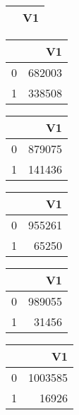 \bigskip\bigskip
\centering
\begin{tabular}{rr}
  \hline
 & V1 \\ 
  \hline
\hline
\end{tabular}

\bigskip\bigskip
\centering
\begin{tabular}{rr}
  \hline
 & V1 \\ 
  \hline
0 & 682003 \\ 
  1 & 338508 \\ 
   \hline
\end{tabular}

\bigskip\bigskip
\centering
\begin{tabular}{rr}
  \hline
 & V1 \\ 
  \hline
0 & 879075 \\ 
  1 & 141436 \\ 
   \hline
\end{tabular}

\bigskip\bigskip
\centering
\begin{tabular}{rr}
  \hline
 & V1 \\ 
  \hline
0 & 955261 \\ 
  1 & 65250 \\ 
   \hline
\end{tabular}

\bigskip\bigskip
\centering
\begin{tabular}{rr}
  \hline
 & V1 \\ 
  \hline
0 & 989055 \\ 
  1 & 31456 \\ 
   \hline
\end{tabular}

\bigskip\bigskip
\centering
\begin{tabular}{rr}
  \hline
 & V1 \\ 
  \hline
0 & 1003585 \\ 
  1 & 16926 \\ 
   \hline
\end{tabular}

